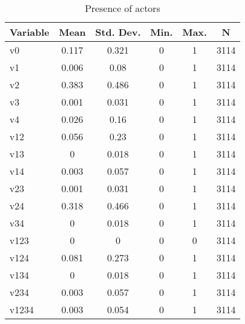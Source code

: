 
\begin{table}[htbp]\centering \caption{Presence of actors \label{sumstat}}
\begin{tabular}{l c c c c c}\hline\hline
\multicolumn{1}{c}{\textbf{Variable}} & \textbf{Mean}
 & \textbf{Std. Dev.}& \textbf{Min.} &  \textbf{Max.} & \textbf{N}\\ \hline
v0 & 0.117 & 0.321 & 0 & 1 & 3114\\
v1 & 0.006 & 0.08 & 0 & 1 & 3114\\
v2 & 0.383 & 0.486 & 0 & 1 & 3114\\
v3 & 0.001 & 0.031 & 0 & 1 & 3114\\
v4 & 0.026 & 0.16 & 0 & 1 & 3114\\
v12 & 0.056 & 0.23 & 0 & 1 & 3114\\
v13 & 0 & 0.018 & 0 & 1 & 3114\\
v14 & 0.003 & 0.057 & 0 & 1 & 3114\\
v23 & 0.001 & 0.031 & 0 & 1 & 3114\\
v24 & 0.318 & 0.466 & 0 & 1 & 3114\\
v34 & 0 & 0.018 & 0 & 1 & 3114\\
v123 & 0 & 0 & 0 & 0 & 3114\\
v124 & 0.081 & 0.273 & 0 & 1 & 3114\\
v134 & 0 & 0.018 & 0 & 1 & 3114\\
v234 & 0.003 & 0.057 & 0 & 1 & 3114\\
v1234 & 0.003 & 0.054 & 0 & 1 & 3114\\
\hline\end{tabular}
\end{table}
